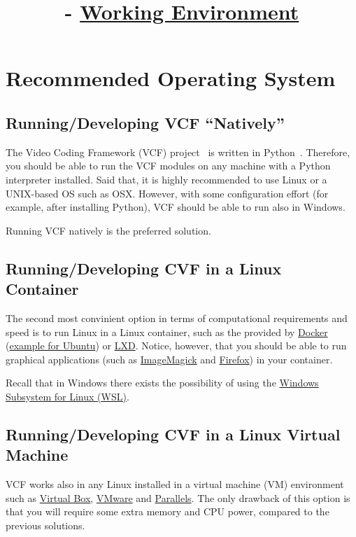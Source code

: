

\title{\SM{} - \href{https://github.com/Sistemas-Multimedia/Sistemas-Multimedia.github.io/tree/master/contents/working_environment}{Working Environment}}

\maketitle

\tableofcontents

\section{Recommended Operating System}

\subsection{Running/Developing VCF ``Natively''}
The Video Coding Framework (VCF) project~\cite{vruiz__VCF} is written in
Python~\cite{python}. Therefore, you should be able to run the VCF
modules on any machine with a Python interpreter installed. Said that,
it is highly recommended to use Linux or a UNIX-based OS such as
OSX. However, with some configuration effort (for example, after
installing Python), VCF should be able to run also in Windows.

Running VCF natively is the preferred solution.

\subsection{Running/Developing CVF in a Linux Container}
The second most convinient option in terms of computational
requirements and speed is to run Linux in a Linux container, such
as the provided by \href{https://hub.docker.com/}{Docker}
(\href{https://hub.docker.com/_/ubuntu}{example for Ubuntu})
or \href{https://linuxcontainers.org/}{LXD}. Notice, however, that you
should be able to run graphical applications (such
as \href{https://linuxcontainers.org/}{ImageMagick}
and \href{https://www.mozilla.org/firefox}{Firefox}) in your
container.

Recall that in Windows there exists the possibility of using the
\href{https://learn.microsoft.com/en-us/windows/wsl/install}{Windows
  Subsystem for Linux (WSL)}.

\subsection{Running/Developing CVF in a Linux Virtual Machine}
VCF works also in any Linux installed in a virtual machine (VM)
environment such as \href{https://www.virtualbox.org/}{Virtual Box},
\href{https://www.vmware.com/}{VMware} and \href{https://www.vmware.com/}{Parallels}.
The only drawback of this option is that you will require
some extra memory and CPU power, compared to the previous solutions.


